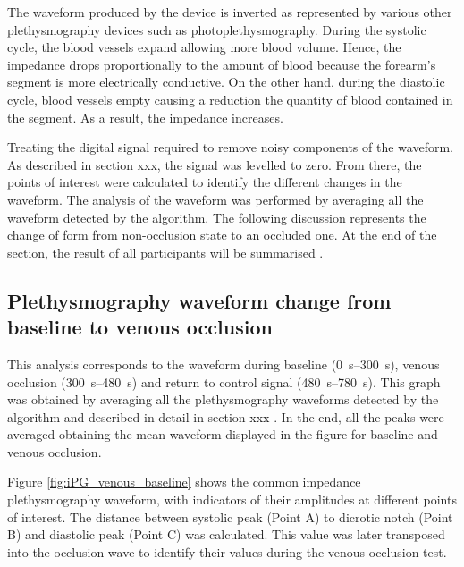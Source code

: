The waveform produced by the device is inverted as represented by various other plethysmography devices such as photoplethysmography. During the systolic cycle, the blood vessels expand allowing more blood volume. Hence, the impedance drops proportionally to the amount of blood because the forearm's segment is more electrically conductive. On the other hand, during the diastolic cycle, blood vessels empty causing a reduction the quantity of blood contained in the segment. As a result, the impedance increases.  

Treating the digital signal required to remove noisy components of the waveform. As described in section xxx, the signal was levelled to zero.  From there, the points of interest were calculated to identify the different changes in the waveform. The analysis of the waveform was performed by averaging all the waveform detected by the algorithm. The following discussion represents the change of form from non-occlusion state to an occluded one. At the end of the section, the result of all participants will be summarised .

\subsection{Plethysmography waveform change from baseline to venous occlusion}
\label{section5.3.1}
This analysis corresponds to the waveform during baseline (\SIrange{0}{300}{\second}), venous occlusion (\SIrange{300}{480}{\second}) and return to control signal (\SIrange{480}{780}{\second}). This graph was obtained by averaging all the plethysmography waveforms detected by the algorithm and described in detail in section xxx . In the end, all the peaks were averaged obtaining the mean waveform displayed in the figure for baseline and venous occlusion.

Figure \ref{fig:iPG_venous_baseline} shows the common impedance plethysmography waveform, with indicators of their amplitudes at different points of interest. The distance between systolic peak (Point A) to dicrotic notch (Point B) and diastolic peak (Point C) was calculated. This value was later transposed into the occlusion wave to identify their values during the venous occlusion test.

